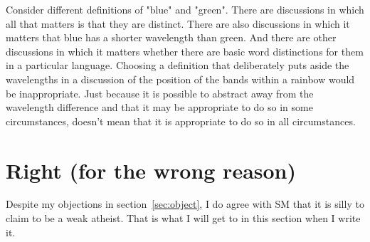 \documentclass[12pt]{article}
\begin{document}
Consider different definitions of "blue" and "green". There are discussions in which all that matters is that they are distinct.
There are also discussions in which it matters that blue has a shorter wavelength than green. And there are other discussions in which it matters whether there are basic word distinctions for them in a particular language.
Choosing a definition that deliberately puts aside the wavelengths in a discussion of the position of the bands within a rainbow would be inappropriate.
Just because it is possible to abstract away from the wavelength difference and that it may be appropriate to do so in some circumstances, doesn't mean that it is appropriate to do so in all circumstances.

\section{Right (for the wrong reason)}

Despite my objections in section~\ref{sec:object}, I do agree with SM that it is silly to claim to be a weak atheist. That is what I will get to in this section when I write it.

\printbibliography
\end{document}
